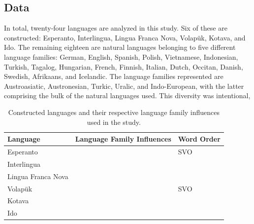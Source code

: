 \documentclass[12pt,a4paper]{article}
\numberwithin{figure}{section}
\numberwithin{table}{section}
\numberwithin{definition}{section}
\begin{document}
\subsection{Data}
\label{ssec:data}

In total, twenty-four languages are analyzed in this study. Six of these are constructed: Esperanto, Interlingua, Lingua Franca Nova, Volapük, Kotava, and Ido. The remaining eighteen are natural languages belonging to five different language families: German, English, Spanish, Polish, Vietnamese, Indonesian, Turkish, Tagalog, Hungarian, French, Finnish, Italian, Dutch, Occitan, Danish, Swedish, Afrikaans, and Icelandic. The language families represented are Austroasiatic, Austronesian, Turkic, Uralic, and Indo-European, with the latter comprising the bulk of the natural languages used. This diversity was intentional, 



\begin{table}[h!]
\centering
\renewcommand{\arraystretch}{1.5}
\begin{tabular} {|p{3cm}|p{3cm}|p{3cm}|}
\hline
\textbf{Language} & \textbf{Language Family Influences} & \textbf{Word Order} \\
\hline
Esperanto & & SVO \\
Interlingua & & \\
Lingua Franca Nova & & \\
Volapük & & SVO \\
Kotava & & \\
Ido & & \\
\hline
\end{tabular}
\caption{Constructed languages and their respective language family influences used in the study.}
\label{tbl:conlangs}
\end{table}
\end{document}
